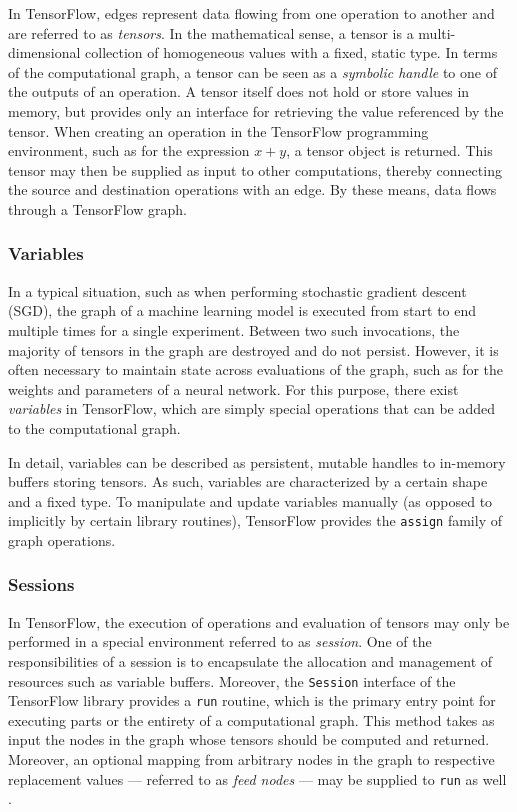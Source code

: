 In TensorFlow, edges represent data flowing from one operation to another and
are referred to as \emph{tensors}. In the mathematical sense, a tensor is a
multi-dimensional collection of homogeneous values with a fixed, static type. In
terms of the computational graph, a tensor can be seen as a \emph{symbolic
  handle} to one of the outputs of an operation. A tensor itself does not hold
or store values in memory, but provides only an interface for retrieving the
value referenced by the tensor. When creating an operation in the TensorFlow
programming environment, such as for the expression $x + y$, a tensor object is
returned. This tensor may then be supplied as input to other computations,
thereby connecting the source and destination operations with an edge. By these
means, data flows through a TensorFlow graph.

\subsubsection{Variables}\label{sec:model-graphs-vars}

In a typical situation, such as when performing stochastic gradient descent
(SGD), the graph of a machine learning model is executed from start to end
multiple times for a single experiment. Between two such invocations, the
majority of tensors in the graph are destroyed and do not persist. However, it
is often necessary to maintain state across evaluations of the graph, such as
for the weights and parameters of a neural network. For this purpose, there
exist \emph{variables} in TensorFlow, which are simply special operations that
can be added to the computational graph.

In detail, variables can be described as persistent, mutable handles to
in-memory buffers storing tensors. As such, variables are characterized by a
certain shape and a fixed type. To manipulate and update variables manually (as
opposed to implicitly by certain library routines), TensorFlow provides the
\texttt{assign} family of graph operations.

\subsubsection{Sessions}\label{sec:model-graphs-sessions}

In TensorFlow, the execution of operations and evaluation of tensors may only be
performed in a special environment referred to as \emph{session}. One of the
responsibilities of a session is to encapsulate the allocation and management of
resources such as variable buffers. Moreover, the \texttt{Session} interface of
the TensorFlow library provides a \texttt{run} routine, which is the primary
entry point for executing parts or the entirety of a computational graph. This
method takes as input the nodes in the graph whose tensors should be computed
and returned. Moreover, an optional mapping from arbitrary nodes in the graph to
respective replacement values --- referred to as \emph{feed nodes} --- may be
supplied to \texttt{run} as well \cite{tensorflow}.

